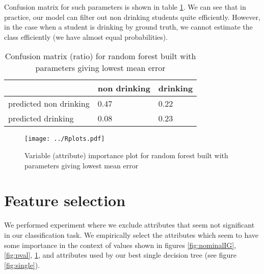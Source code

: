 \documentclass[a4paper]{article}
\begin{document}
Confusion matrix for such parameters is shown in table \ref{table:convMx}.
We can see that in practice, our model can filter out non drinking students
quite efficiently.
However, in the case when a student is drinking by ground truth, we cannot
estimate the class efficiently (we have almost equal probabilities).

\begin{table}[!hbt]
    \caption{Confusion matrix (ratio) for random forest built with parameters giving lowest mean error
    \label{table:convMx}
    }
\begin{center}
    \begin{tabular}{| l | l | l |}
    \hline
        & non drinking & drinking \\
    \hline
        predicted non drinking  & 0.47 & 0.22 \\
        predicted drinking  &  0.08 & 0.23 \\
    \hline
    \end{tabular}
\end{center}
\end{table}


\begin{figure}[!hbt]
    \centering
    \texttt{[image: ../Rplots.pdf]}
    \caption[]{Variable (attribute) importance plot for random forest built with parameters giving lowest mean error
    \label{fig:importance}
    }
\end{figure}


% 
% 

\section{Feature selection}
\label{featSel}
We performed experiment where we exclude attributes that
seem not significant in our classification task.
We empirically select the attributes which seem to have some importance in the context of
values shown in figures \ref{fig:nominalIG}, \ref{fig:pval}, \ref{fig:importance},
and attributes used by our best single decision tree (see figure \ref{fig:single}).
\end{document}

